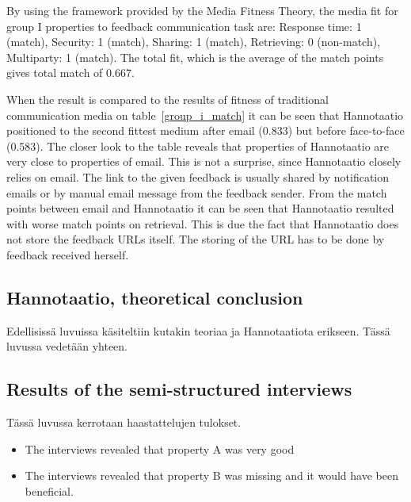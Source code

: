 \documentclass[english,12pt,a4paper,pdftex]{article}
\begin{document}
By using the framework provided by the Media Fitness Theory, the media fit for group I properties to feedback communication task are: Response time: 1 (match), Security: 1 (match), Sharing: 1 (match), Retrieving: 0 (non-match), Multiparty: 1 (match). The total fit, which is the average of the match points gives total match of 0.667.

When the result is compared to the results of fitness of traditional communication media on table~\ref{group_i_match} it can be seen that Hannotaatio positioned to the second fittest medium after email (0.833) but before face-to-face (0.583). The closer look to the table reveals that properties of Hannotaatio are very close to properties of email. This is not a surprise, since Hannotaatio closely relies on email. The link to the given feedback is usually shared by notification emails or by manual email message from the feedback sender. From the match points between email and Hannotaatio it can be seen that Hannotaatio resulted with worse match points on retrieval. This is due the fact that Hannotaatio does not store the feedback URLs itself. The storing of the URL has to be done by feedback received herself.

\subsection{Hannotaatio, theoretical conclusion}

Edellisissä luvuissa käsiteltiin kutakin teoriaa ja Hannotaatiota erikseen. Tässä luvussa vedetään yhteen.

\subsection{Results of the semi-structured interviews}

Tässä luvussa kerrotaan haastattelujen tulokset.

\begin{itemize}
\item The interviews revealed that property A was very good
\item The interviews revealed that property B was missing and it would have been beneficial.
\end{itemize}
\end{document}
